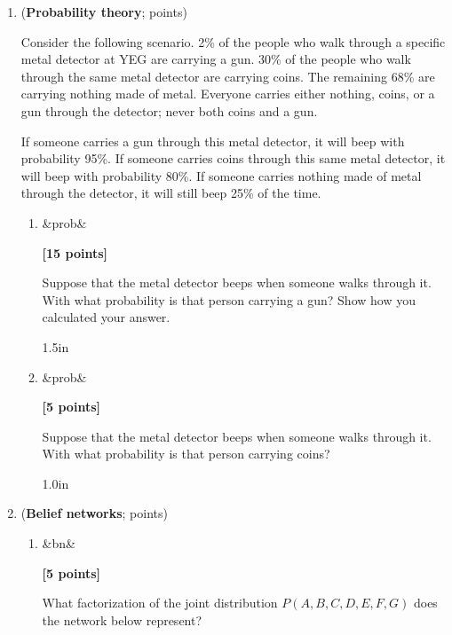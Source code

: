 \documentclass{article}
\newcounter{totalpoints}
\newcommand{\question}[2][]{(\textbf{#2}; \subtotal{#1})}
\newcommand{\subtotal}[1]{\newcounter{#1}\setcounter{#1}{0}\regtotcounter{#1}\total{#1} points}
\newcommand{\points}[2][]{{\addtocounter{totalpoints}{#2}\ifx&#1&\else\addtocounter{#1}{#2}\fi\textbf{[#2 points]}}}
\begin{document}
\clearpage




\begin{enumerate}




\item \question[prob]{Probability theory}

Consider the following scenario.
2\% of the people who walk through a specific metal detector at YEG are carrying a gun.
30\% of the people who walk through the same metal detector are carrying coins.
The remaining 68\% are carrying nothing made of metal.
Everyone carries either nothing, coins, or a gun through the detector; never both coins and a gun.

If someone carries a gun through this metal detector, it will beep with probability 95\%.
If someone carries coins through this same metal detector, it will beep with probability 80\%.
If someone carries nothing made of metal through the detector, it will still beep 25\% of the time.

\begin{enumerate}
\item \points[prob]{15} \label{q:prob-gun}
Suppose that the metal detector beeps when someone walks through it.
With what probability is that person carrying a gun?  Show how you calculated your answer.

\begin{answer}{1.5in}
\end{answer}

\item \points[prob]{5}
Suppose that the metal detector beeps when someone walks through it.
With what probability is that person carrying coins?

\begin{answer}{1.0in}
\end{answer}


\end{enumerate}

\clearpage



\item \question[bn]{Belief networks}

\begin{enumerate}
\item \points[bn]{5}
What factorization of the joint distribution $P(A,B,C,D,E,F,G)$ does the network below represent?


\end{enumerate}
\end{enumerate}
\end{document}
